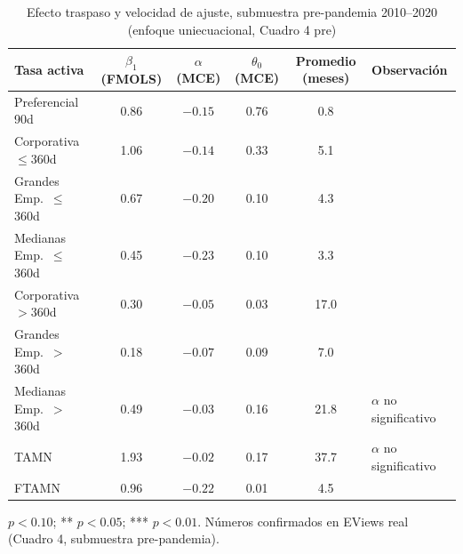 \documentclass[12pt, letterpaper]{article}
\begin{document}
\begin{table}[ht]
\renewcommand{\thetable}{14}
\begin{threeparttable}
\caption{Efecto traspaso y velocidad de ajuste, submuestra
         pre-pandemia 2010--2020 (enfoque uniecuacional, Cuadro 4 pre)}
\label{tab:cuadro4pre}
\small
\begin{tabular}{lccccl}
\toprule
Tasa activa & $\beta_1$ (FMOLS) & $\alpha$ (MCE) & $\theta_0$ (MCE) & Promedio (meses) & Observación\\
\midrule
Preferencial 90d         & 0.86\rlap{***} & $-0.15$\rlap{***} & 0.76\rlap{***} & 0.8  & \\
Corporativa $\le$360d    & 1.06\rlap{***} & $-0.14$\rlap{***} & 0.33\rlap{***} & 5.1  & \\
Grandes Emp.\ $\le$360d  & 0.67\rlap{***} & $-0.20$\rlap{***} & 0.10           & 4.3  & \\
Medianas Emp.\ $\le$360d & 0.45\rlap{***} & $-0.23$\rlap{***} & 0.10           & 3.3  & \\
Corporativa $>$360d      & 0.30\rlap{***} & $-0.05$\rlap{***} & 0.03           & 17.0 & \\
Grandes Emp.\ $>$360d    & 0.18\rlap{*}   & $-0.07$\rlap{***} & 0.09           & 7.0  & \\
Medianas Emp.\ $>$360d   & 0.49\rlap{***} & $-0.03$           & 0.16\rlap{*}   & 21.8 & $\alpha$ no significativo \\
TAMN                     & 1.93\rlap{***} & $-0.02$           & 0.17           & 37.7 & $\alpha$ no significativo \\
FTAMN                    & 0.96\rlap{***} & $-0.22$\rlap{***} & 0.01           & 4.5  & \\
\bottomrule
\end{tabular}
\begin{tablenotes}[flushleft]
\footnotesize
\item * $p<0.10$; ** $p<0.05$; *** $p<0.01$. Números confirmados en
EViews real (Cuadro 4, submuestra pre-pandemia).
\end{tablenotes}
\end{threeparttable}
\end{table}
\end{document}
